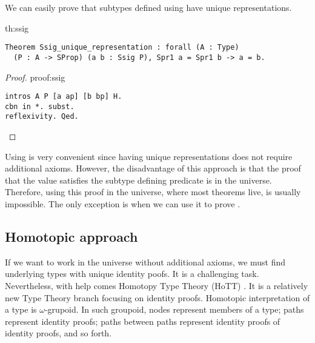We can easily prove that subtypes defined using  have unique representations.
\begin{theo}{}{th:ssig}
\begin{verbatim}
Theorem Ssig_unique_representation : forall (A : Type) 
  (P : A -> SProp) (a b : Ssig P), Spr1 a = Spr1 b -> a = b.
\end{verbatim}
\end{theo}
\begin{proof}{}{proof:ssig}
\begin{verbatim}
intros A P [a ap] [b bp] H.
cbn in *. subst.
reflexivity. Qed.
\end{verbatim}
\end{proof}
Using  is very convenient since having unique representations does not require additional axioms. However, the disadvantage of this approach is that the proof that the value satisfies the subtype defining predicate is in the  universe. Therefore, using this proof in the  universe, where most theorems live, is usually impossible. The only exception is when we can use it to prove .
\subsection{Homotopic approach}
If we want to work in the  universe without additional axioms, we must find underlying types with unique identity poofs. It is a challenging task. Nevertheless, with help comes Homotopy Type Theory (HoTT) \cite{HoTT}. It is a relatively new Type Theory branch focusing on identity proofs. Homotopic interpretation of a type is $\omega$-grupoid. In such groupoid, nodes represent members of a type; paths represent identity proofs; paths between paths represent identity proofs of identity proofs, and so forth. 

